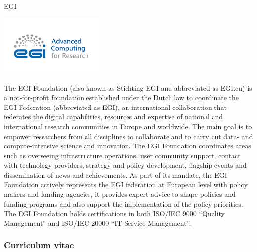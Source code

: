 \begin{sitedescription}{EGI}

\begin{center}
\includegraphics[height=3cm]{Participants/Logos/EGI.png}
\end{center}

The EGI Foundation (also known as Stichting EGI and abbreviated as EGI.eu) 
is a not-for-profit foundation established under the Dutch law to coordinate 
the EGI Federation (abbreviated as EGI), an international collaboration that 
federates the digital capabilities, resources and expertise of national and 
international research communities in Europe and worldwide. 
The main goal is to empower researchers from all disciplines to collaborate 
and to carry out data- and compute-intensive science and innovation. 
The EGI Foundation coordinates areas such as overseeing infrastructure operations, 
user community support, contact with technology providers, strategy and policy 
development, flagship events and dissemination of news and achievements. 
As part of its mandate, the EGI Foundation actively represents the EGI federation 
at European level with policy makers and funding agencies, it provides expert 
advice to shape policies and funding programs and also support the implementation 
of the policy priorities. 
The EGI Foundation holds certifications in both ISO/IEC 9000 “Quality Management” 
and ISO/IEC 20000 “IT Service Management”. 

%

\subsubsection*{Curriculum vitae}



\end{sitedescription}
